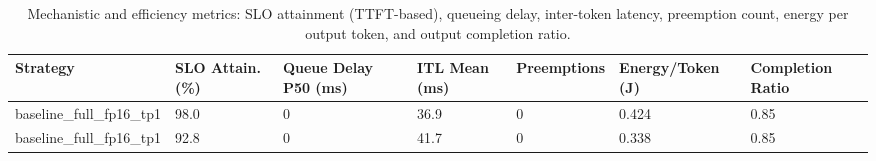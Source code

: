 \begin{table}
\caption{Mechanistic and efficiency metrics: SLO attainment (TTFT-based), queueing delay, inter-token latency, preemption count, energy per output token, and output completion ratio.}
\label{tab:efficiency}
\begin{tabular}{lllllll}
\toprule
Strategy & SLO Attain. (\%) & Queue Delay P50 (ms) & ITL Mean (ms) & Preemptions & Energy/Token (J) & Completion Ratio \\
\midrule
baseline\_full\_fp16\_tp1 & 98.0 & 0 & 36.9 & 0 & 0.424 & 0.85 \\
baseline\_full\_fp16\_tp1 & 92.8 & 0 & 41.7 & 0 & 0.338 & 0.85 \\
\bottomrule
\end{tabular}
\end{table}
